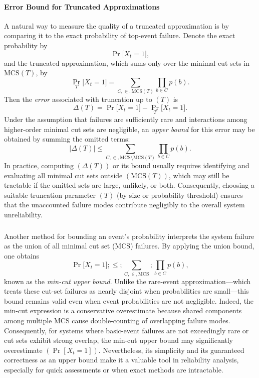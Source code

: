 \paragraph{Error Bound for Truncated Approximations}
A natural way to measure the quality of a truncated approximation is by comparing it to the exact probability of top-event failure. Denote the exact probability by
\[
\Pr\bigl[X_t = 1\bigr],
\]
and the truncated approximation, which sums only over the minimal cut sets in $\mathrm{MCS}(T)$, by
\[
\Pr_{T}\bigl[X_t = 1\bigr]
=
\sum_{C ,\in, \mathrm{MCS}(T)} \prod_{b \in C} p(b).
\]
Then the \emph{error} associated with truncation up to $(T)$ is
\begin{equation}\label{eq:truncation_error_definition}
\Delta(T)
=
\Pr\bigl[X_t = 1\bigr]
-
\Pr_{T}\bigl[X_t = 1\bigr].
\end{equation}
Under the assumption that failures are sufficiently rare and interactions among higher-order minimal cut sets are negligible, an \emph{upper bound} for this error may be obtained by summing the omitted terms:
\begin{equation}\label{eq:truncation_error_bound}
\bigl|\Delta(T)\bigr|
\le
\sum_{C ,\in, \mathrm{MCS}\setminus \mathrm{MCS}(T)}
\prod_{b \in C} p(b).
\end{equation}
In practice, computing $(\Delta(T))$ or its bound usually requires identifying and evaluating all minimal cut sets outside $(\mathrm{MCS}(T))$, which may still be tractable if the omitted sets are large, unlikely, or both. Consequently, choosing a suitable truncation parameter $(T)$ (by size or probability threshold) ensures that the unaccounted failure modes contribute negligibly to the overall system unreliability.

\subsubsection{\color{blue}{The Min-Cut Upper Bound}}
Another method for bounding an event's probability interprets the system failure as the union of all minimal cut set (MCS) failures. By applying the union bound, one obtains
\begin{equation}
\label{eq:mcub}
\Pr\bigl[X_t=1\bigr]
;\le;
\sum_{C,\in,\mathrm{MCS}}
;\prod_{b \in C} p(b),
\end{equation}
known as the \emph{min-cut upper bound}. Unlike the rare-event approximation—which treats these cut-set failures as nearly disjoint when probabilities are small—this bound remains valid even when event probabilities are not negligible. Indeed, the min-cut expression is a conservative overestimate because shared components among multiple MCS cause double-counting of overlapping failure modes. Consequently, for systems where basic-event failures are not exceedingly rare or cut sets exhibit strong overlap, the min-cut upper bound may significantly overestimate $(\Pr[X_t=1])$. Nevertheless, its simplicity and its guaranteed correctness as an upper bound make it a valuable tool in reliability analysis, especially for quick assessments or when exact methods are intractable.

